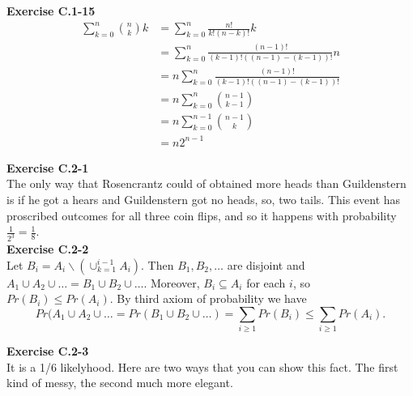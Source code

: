 \documentclass{article}
\begin{document}
\noindent\textbf{Exercise C.1-15}\\

\begin{align*}
\sum_{k=0}^n \binom{n}{k}k &= \sum_{k=0}^n \frac{n!}{k!(n-k)!}k\\
&=\sum_{k=0}^n \frac{(n-1)!}{(k-1)!((n-1)-(k-1))!} n\\
&= n \sum_{k=0}^{n}\frac{(n-1)!}{(k-1)!((n-1)-(k-1))!}\\
&=n \sum_{k=0}^n \binom{n-1}{k-1}\\
&=n \sum_{k=0}^{n-1} \binom{n-1}{k}\\
&=n2^{n-1}
\end{align*}

\noindent\textbf{Exercise C.2-1}\\

The only way that Rosencrantz could of obtained more heads than Guildenstern is if he got a hears and Guildenstern got no heads, so, two tails. This event has proscribed outcomes for all three coin flips, and so it happens with probability $\frac{1}{2^3} = \frac{1}{8}$.\\


\noindent\textbf{Exercise C.2-2}\\

Let $B_i = A_i \backslash (\cup_{k=1}^{i-1}A_i)$.  Then $B_1, B_2, \ldots $ are disjoint and $A_1 \cup A_2 \cup \ldots = B_1 \cup B_2 \cup \ldots$.  Moreover, $B_i \subseteq A_i$ for each $i$, so $Pr(B_i) \leq Pr(A_i)$.  By third axiom of probability we have 
\[ Pr(A_1 \cup A_2 \cup \ldots = Pr(B_1 \cup B_2 \cup \ldots) = \sum_{i \geq 1} Pr(B_i) \leq \sum_{i \geq 1} Pr(A_i).\]

\noindent\textbf{Exercise C.2-3}\\

It is a 1/6 likelyhood. Here are two ways that you can show this fact. The first kind of messy, the second much more elegant.
\end{document}
